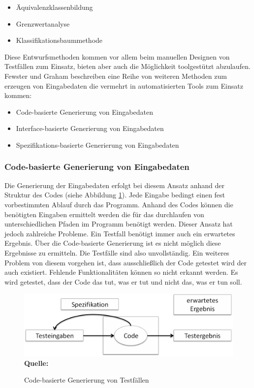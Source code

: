 \begin{itemize}
\item Äquivalenzklassenbildung
\item Grenzwertanalyse
\item Klassifikationsbaummethode
\end{itemize}
Diese Entwurfsmethoden kommen vor allem beim manuellen Designen von Testfällen zum Einsatz, bieten aber auch die Möglichkeit toolgestützt abzulaufen.
Fewster und Graham \cite[vgl. S. 19 ff.]{fewster_software_1999} beschreiben eine Reihe von weiteren Methoden zum erzeugen von Eingabedaten die vermehrt in automatisierten Tools zum Einsatz kommen:
\begin{itemize}
\item Code-basierte Generierung von Eingabedaten
\item Interface-basierte Generierung von Eingabedaten
\item Spezifikations-basierte Generierung von Eingabedaten
\end{itemize}

\subsubsection{Code-basierte Generierung von Eingabedaten}
\label{subsubsec:codebasierte_generierung}
Die Generierung der Eingabedaten erfolgt bei diesem Ansatz anhand der Struktur des Codes (siehe Abbildung \ref{fig:codeBasedDesign}). Jede Eingabe bedingt einen fest vorbestimmten Ablauf durch das Programm. Anhand des Codes können die benötigten Eingaben ermittelt werden die für das durchlaufen von unterschiedlichen Pfaden im Programm benötigt werden.
Dieser Ansatz hat jedoch zahlreiche Probleme. Ein Testfall benötigt immer auch ein erwartetes Ergebnis. Über die Code-basierte Generierung ist es nicht möglich diese Ergebnisse zu ermitteln. Die Testfälle sind also unvollständig. Ein weiteres Problem von diesem vorgehen ist, dass ausschließlich der Code getestet wird der auch existiert. Fehlende Funktionalitäten können so nicht erkannt werden. Es wird getestet, dass der Code das \grq tut, was er tut und nicht das, was er tun soll.\grq \cite[vgl. S. 19,20]{fewster_software_1999}
\begin{figure}[htb]
  \centering  
  \includegraphics[scale=0.6]{img/codeBasedDesign.png}\\
  \footnotesize\sffamily\textbf{Quelle:} \cite[vgl. S. 19]{fewster_software_1999}
  \caption{Code-basierte Generierung von Testfällen}
  \label{fig:codeBasedDesign}
\end{figure}


